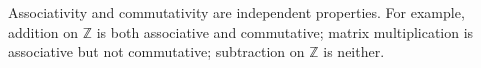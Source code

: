 \begin{remark*}[Interpretation]
Associativity and commutativity are independent properties. For example,
addition on $\mathbb{Z}$ is both associative and commutative; matrix
multiplication is associative but not commutative; subtraction on
$\mathbb{Z}$ is neither.
\end{remark*}































